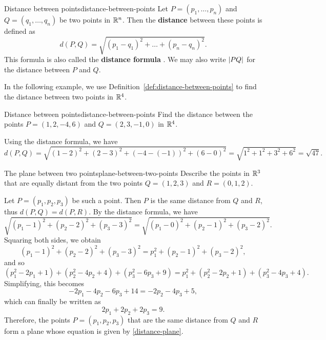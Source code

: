 \begin{definition}{Distance between points}{distance-between-points}
  Let $P=(p_1,\ldots,p_n)$ and $Q=(q_1,\ldots,q_n)$ be two points in
  $\mathbb{R}^n$. Then the \textbf{distance}%
   between these points is defined as
  \begin{equation*}
    d(P, Q) = \sqrt{(p_1-q_1)^2 + \ldots + (p_n-q_n)^2}.
  \end{equation*}
  This formula is also called the \textbf{distance formula}%
  . We may also write $\left|PQ\right|$ for the
  distance between $P$ and $Q$.
\end{definition}

In the following example, we use
Definition~\ref{def:distance-between-points} to find the distance
between two points in $\mathbb{R}^4$.

\begin{example}{Distance between points}{distance-between-points}
  Find the distance between the points $P=(1,2,-4,6)$ and
  $Q=(2,3,-1,0)$ in $\mathbb{R}^4$.
\end{example}

\begin{solution}
  Using the distance formula, we have
  \begin{equation*}
    d(P,Q)
    = \sqrt{(1-2)^2+(2-3)^2+(-4-(-1))^2+(6-0)^2}
    = \sqrt{1^2+1^2+3^2+6^2}
    = \sqrt{47}.
  \end{equation*}
\end{solution}

\begin{example}{The plane between two points}{plane-between-two-points}
  Describe the points in $\mathbb{R}^3$ that are equally distant from the two
  points $Q=(1,2,3)$ and $R=(0,1,2)$.
\end{example}

\begin{solution}
  Let $P = (p_1,p_2,p_3)$ be such a point. Then $P$ is the same
  distance from $Q$ and $R$, thus $d(P,Q)=d(P,R)$. By the distance
  formula, we have
  \begin{equation*}
    \sqrt{(p_1-1)^2+(p_2-2)^2+(p_3-3)^2}=
    \sqrt{(p_1-0)^2+(p_2-1)^2+(p_3-2)^2}.
  \end{equation*}
  Squaring both sides, we obtain
  \begin{equation*}
    (p_1 -1)^2+(p_2 -2)^2+(p_3 -3)^2
    = p_1^2+(p_2-1)^2+(p_3 -2)^2,
  \end{equation*}
  and so
  \begin{equation*}
    \allowbreak (p_1^2-2p_1+1)+(p_2^2-4p_2+4)+(p_3^2-6p_3+9)=p_1^2+(p_2^2-2p_2+1)+(p_3^2-4p_3+4).
  \end{equation*}
  Simplifying, this becomes
  \begin{equation*}
    -2p_1-4p_2-6p_3+14=-2p_2-4p_3+5,
  \end{equation*}
  which can finally be written as
  \begin{equation}\label{distance-plane}
    2p_1+2p_2+2p_3=9.
  \end{equation}
  Therefore, the points $P = (p_1,p_2,p_3)$ that are the same
  distance from $Q$ and $R$ form a plane whose equation is given by
  \eqref{distance-plane}.
\end{solution}

